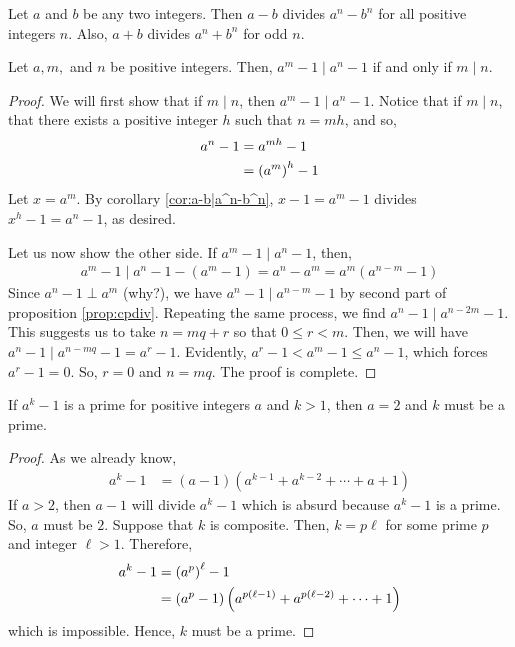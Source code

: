 \begin{corollary}
	\label{cor:a-b|a^n-b^n}
	Let $a$ and $b$ be any two integers. Then $a-b$ divides $a^n-b^n$ for all positive integers $n$. Also, $a+b$ divides $a^n+b^n$ for odd $n$.
\end{corollary}


\begin{theorem}\label{thm:powerdiv}
	Let $a,m,$ and $n$ be positive integers. Then, $a^m-1\mid a^n-1$ if and only if $m\mid n$.
\end{theorem}

\begin{proof}
	We will first show that if $m\mid n$, then $a^m-1\mid a^n-1$. Notice that if $m\mid n$, that there exists a positive integer $h$ such that $n=mh$, and so,
	\begin{align*}
		a^n-1
			& = a^{mh}-1\\
			& = \left(a^m\right)^h -1
	\end{align*}
	Let $x=a^m$. By corollary \eqref{cor:a-b|a^n-b^n}, $x-1=a^m-1$ divides $x^h-1=a^n-1$, as desired.

	Let us now show the other side. If $a^m-1\mid a^n-1$, then,
	\begin{align*}
		a^m-1\mid a^n-1-(a^m-1)=a^n-a^m=a^m(a^{n-m}-1)
	\end{align*}
	Since $a^n-1\perp a^m$ (why?), we have $a^n-1\mid a^{n-m}-1$ by second part of proposition \eqref{prop:cpdiv}. Repeating the same process, we find $a^n-1\mid a^{n-2m}-1$. This suggests us to take $n=mq+r$ so that $0\leq r<m$. Then, we will have $a^n-1\mid a^{n-mq}-1=a^r-1$. Evidently, $a^r-1<a^m-1\leq a^n-1$, which forces $a^r-1=0$. So, $r=0$ and $n=mq$. The proof is complete.
\end{proof}

\begin{theorem}
	\label{thm:a^k-1prime}
	If $a^k-1$ is a prime for positive integers $a$ and $k>1$, then $a=2$ and $k$ must be a prime.
\end{theorem}

\begin{proof}
	As we already know,
	\begin{align*}
		a^k-1 & = (a-1)(a^{k-1}+a^{k-2}+\cdots+a+1)
	\end{align*}
	If $a>2$, then $a-1$ will divide $a^k-1$ which is absurd because $a^k-1$ is a prime. So, $a$ must be $2$. Suppose that $k$ is composite. Then, $k=p\ell$ for some prime $p$ and integer $\ell>1$. Therefore,
	\begin{align*}
		a^k-1&=\left(a^p\right)^\ell -1\\
		&= (a^p-1)\left(a^{p(\ell-1)}+a^{p(\ell-2)}+\cdots+1\right)
	\end{align*}
	which is impossible. Hence, $k$ must be a prime.
\end{proof}

